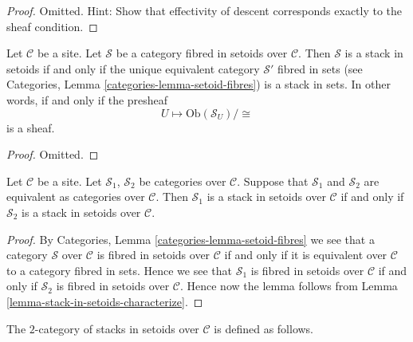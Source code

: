 \begin{proof}
Omitted. Hint: Show that effectivity of descent corresponds exactly to
the sheaf condition.
\end{proof}

\begin{lemma}
\label{lemma-stack-in-setoids-characterize}
Let $\mathcal{C}$ be a site.
Let $\mathcal{S}$ be a category fibred in setoids over $\mathcal{C}$.
Then $\mathcal{S}$ is a stack in setoids if and only if the unique
equivalent category $\mathcal{S}'$ fibred in sets (see
Categories, Lemma \ref{categories-lemma-setoid-fibres})
is a stack in sets. In other words, if and only if the presheaf
$$
U \longmapsto \text{Ob}(\mathcal{S}_U)/\!\!\cong
$$
is a sheaf.
\end{lemma}

\begin{proof}
Omitted.
\end{proof}

\begin{lemma}
\label{lemma-stack-in-setoids-equivalent}
Let $\mathcal{C}$ be a site.
Let $\mathcal{S}_1$, $\mathcal{S}_2$ be categories over $\mathcal{C}$.
Suppose that $\mathcal{S}_1$ and $\mathcal{S}_2$ are equivalent
as categories over $\mathcal{C}$.
Then $\mathcal{S}_1$ is a stack in setoids over $\mathcal{C}$ if and only if
$\mathcal{S}_2$ is a stack in setoids over $\mathcal{C}$.
\end{lemma}

\begin{proof}
By
Categories, Lemma \ref{categories-lemma-setoid-fibres}
we see that a category $\mathcal{S}$ over $\mathcal{C}$ is fibred in setoids
over $\mathcal{C}$ if and only if it is equivalent over $\mathcal{C}$
to a category fibred in sets.
Hence we see that $\mathcal{S}_1$ is fibred in setoids over $\mathcal{C}$
if and only if $\mathcal{S}_2$ is fibred in setoids over $\mathcal{C}$.
Hence now the lemma follows from
Lemma \ref{lemma-stack-in-setoids-characterize}.
\end{proof}

\noindent
The $2$-category of stacks in setoids over $\mathcal{C}$
is defined as follows.

